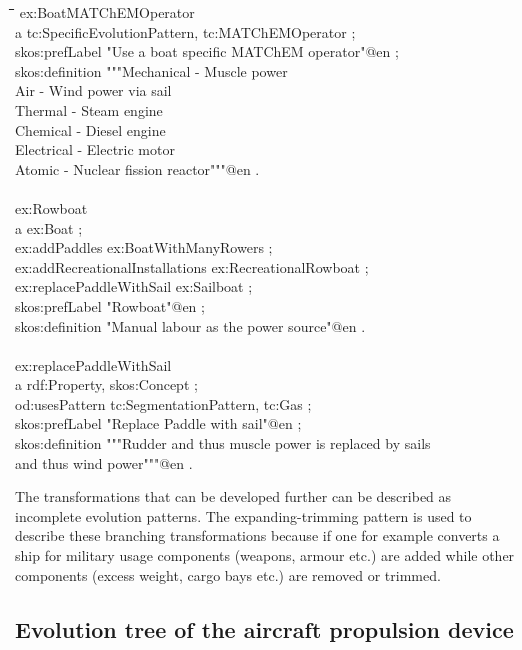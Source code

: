 \documentclass[11pt,a4paper]{article}
\newenvironment{code}{\tt \begin{tabbing}
\hskip12pt\=\hskip12pt\=\hskip12pt\=\hskip12pt\=\hskip5cm\=\hskip5cm\=\kill}
{\end{tabbing}}
\begin{document}
\begin{code}
ex:BoatMATChEMOperator\\
\> a tc:SpecificEvolutionPattern, tc:MATChEMOperator ;\\
\> skos:prefLabel "Use a boat specific MATChEM operator"@en ;\\
\> skos:definition """Mechanical - Muscle power\\
\> Air - Wind power via sail\\
\> Thermal - Steam engine\\
\> Chemical - Diesel engine\\
\> Electrical - Electric motor\\
\> Atomic - Nuclear fission reactor"""@en .\\
\\
ex:Rowboat \\
\> a ex:Boat ; \\ 
\> ex:addPaddles ex:BoatWithManyRowers ; \\
\> ex:addRecreationalInstallations ex:RecreationalRowboat ; \\
\> ex:replacePaddleWithSail ex:Sailboat ; \\
\> skos:prefLabel "Rowboat"@en ; \\
\> skos:definition "Manual labour as the power source"@en . \\
\\
ex:replacePaddleWithSail \\
\> a rdf:Property, skos:Concept ; \\
\> od:usesPattern tc:SegmentationPattern, tc:Gas ; \\
\> skos:prefLabel "Replace Paddle with sail"@en ; \\
\> skos:definition """Rudder and thus muscle power is replaced by sails \\
\>\> and thus wind power"""@en .
    
\end{code}

The transformations that can be developed further can be described as incomplete evolution patterns. The expanding-trimming pattern is used to describe these branching transformations because if one for example converts a ship for military usage components (weapons, armour etc.) are added while other components (excess weight, cargo bays etc.) are removed or trimmed.

\subsection{Evolution tree of the aircraft propulsion device}
\end{document}
